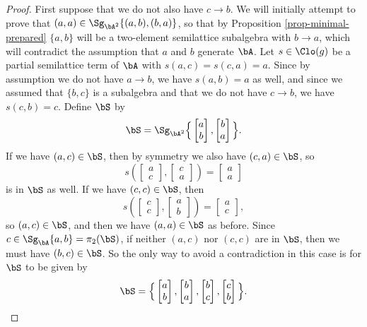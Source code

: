 \begin{proof}
First suppose that we do not also have $c \rightarrow b$. We will initially attempt to prove that $(a,a) \in \Sg_{\bA^2}\{(a,b),(b,a)\}$, so that by Proposition \ref{prop-minimal-prepared} $\{a,b\}$ will be a two-element semilattice subalgebra with $b \rightarrow a$, which will contradict the assumption that $a$ and $b$ generate $\bA$. Let $s \in \Clo(g)$ be a partial semilattice term of $\bA$ with $s(a,c) = s(c,a) = a$. Since by assumption we do not have $a \rightarrow b$, we have $s(a,b) = a$ as well, and since we assumed that $\{b,c\}$ is a subalgebra and that we do not have $c \rightarrow b$, we have $s(c,b) = c$. Define $\bS$ by
\[
\bS = \Sg_{\bA^2}\Big\{\begin{bmatrix}a\\ b\end{bmatrix},\begin{bmatrix}b\\ a\end{bmatrix}\Big\}.
\]
If we have $(a,c) \in \bS$, then by symmetry we also have $(c,a) \in \bS$, so
\[
s\left(\begin{bmatrix}a\\ c\end{bmatrix},\begin{bmatrix}c\\ a\end{bmatrix}\right) = \begin{bmatrix}a\\ a\end{bmatrix}
\]
is in $\bS$ as well. If we have $(c,c) \in \bS$, then
\[
s\left(\begin{bmatrix}c\\ c\end{bmatrix},\begin{bmatrix}a\\ b\end{bmatrix}\right) = \begin{bmatrix}a\\ c\end{bmatrix},
\]
so $(a,c) \in \bS$, and then we have $(a,a) \in \bS$ as before. Since $c \in \Sg_\bA\{a,b\} = \pi_2(\bS)$, if neither $(a,c)$ nor $(c,c)$ are in $\bS$, then we must have $(b,c) \in \bS$. So the only way to avoid a contradiction in this case is for $\bS$ to be given by
\[
\bS = \Big\{\begin{bmatrix}a\\ b\end{bmatrix},\begin{bmatrix}b\\ a\end{bmatrix},\begin{bmatrix}b\\ c\end{bmatrix},\begin{bmatrix}c\\ b\end{bmatrix}\Big\}.
\]
\end{proof}
